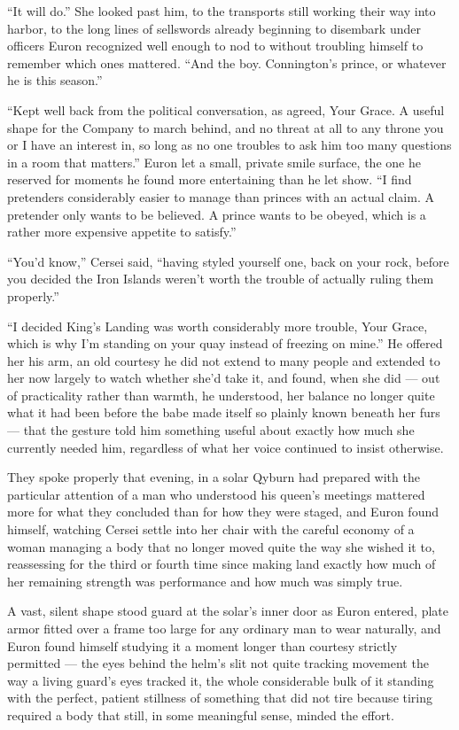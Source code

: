 “It will do.” She looked past him, to the transports still working their way into harbor, to the long lines of sellswords already beginning to disembark under officers Euron recognized well enough to nod to without troubling himself to remember which ones mattered. “And the boy. Connington’s prince, or whatever he is this season.”

“Kept well back from the political conversation, as agreed, Your Grace. A useful shape for the Company to march behind, and no threat at all to any throne you or I have an interest in, so long as no one troubles to ask him too many questions in a room that matters.” Euron let a small, private smile surface, the one he reserved for moments he found more entertaining than he let show. “I find pretenders considerably easier to manage than princes with an actual claim. A pretender only wants to be believed. A prince wants to be obeyed, which is a rather more expensive appetite to satisfy.”

“You’d know,” Cersei said, “having styled yourself one, back on your rock, before you decided the Iron Islands weren’t worth the trouble of actually ruling them properly.”

“I decided King’s Landing was worth considerably more trouble, Your Grace, which is why I’m standing on your quay instead of freezing on mine.” He offered her his arm, an old courtesy he did not extend to many people and extended to her now largely to watch whether she’d take it, and found, when she did — out of practicality rather than warmth, he understood, her balance no longer quite what it had been before the babe made itself so plainly known beneath her furs — that the gesture told him something useful about exactly how much she currently needed him, regardless of what her voice continued to insist otherwise.

\sceneBreak

They spoke properly that evening, in a solar Qyburn had prepared with the particular attention of a man who understood his queen’s meetings mattered more for what they concluded than for how they were staged, and Euron found himself, watching Cersei settle into her chair with the careful economy of a woman managing a body that no longer moved quite the way she wished it to, reassessing for the third or fourth time since making land exactly how much of her remaining strength was performance and how much was simply true.

A vast, silent shape stood guard at the solar’s inner door as Euron entered, plate armor fitted over a frame too large for any ordinary man to wear naturally, and Euron found himself studying it a moment longer than courtesy strictly permitted — the eyes behind the helm’s slit not quite tracking movement the way a living guard’s eyes tracked it, the whole considerable bulk of it standing with the perfect, patient stillness of something that did not tire because tiring required a body that still, in some meaningful sense, minded the effort.

